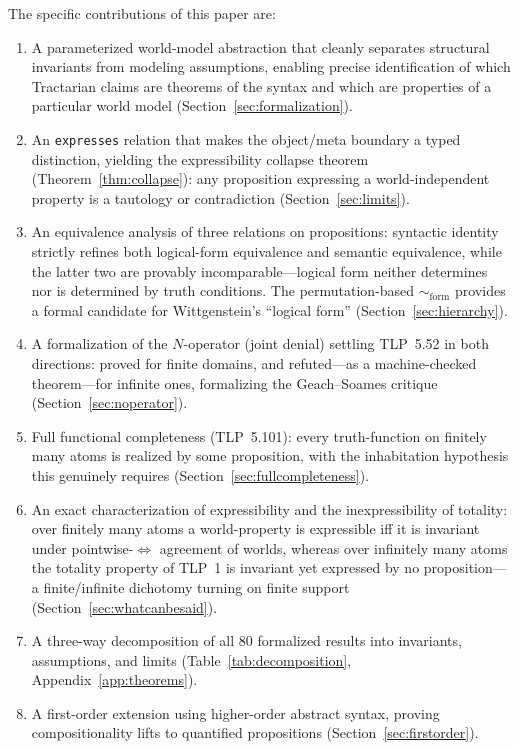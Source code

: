 \documentclass[jsl,bibother]{asl}
\theoremstyle{definition}
\theoremstyle{remark}
\newcommand{\formEq}{\sim_{\mathrm{form}}}
\begin{document}
\noindent
The specific contributions of this paper are:
\begin{enumerate}[nosep, label=(\arabic*)]
  \item A parameterized world-model abstraction that cleanly
    separates structural invariants from modeling assumptions,
    enabling precise identification of which Tractarian claims
    are theorems of the syntax and which are properties of a
    particular world model (Section~\ref{sec:formalization}).
  \item An \texttt{expresses} relation that makes the object/meta
    boundary a typed distinction, yielding the expressibility
    collapse theorem (Theorem~\ref{thm:collapse}): any proposition
    expressing a world-independent property is a tautology or
    contradiction (Section~\ref{sec:limits}).
  \item An equivalence analysis of three relations on
    propositions: syntactic identity strictly refines both
    logical-form equivalence and semantic equivalence, while the
    latter two are provably incomparable---logical form neither
    determines nor is determined by truth conditions.  The
    permutation-based $\formEq$ provides a formal candidate for
    Wittgenstein's ``logical form'' (Section~\ref{sec:hierarchy}).
  \item A formalization of the $N$-operator (joint denial)
    settling TLP~5.52 in both directions: proved for finite
    domains, and refuted---as a machine-checked theorem---for
    infinite ones, formalizing the Geach--Soames critique
    (Section~\ref{sec:noperator}).
  \item Full functional completeness (TLP~5.101): every
    truth-function on finitely many atoms is realized by some
    proposition, with the inhabitation hypothesis this genuinely
    requires (Section~\ref{sec:fullcompleteness}).
  \item An exact characterization of expressibility and the
    inexpressibility of totality: over finitely many atoms a
    world-property is expressible iff it is invariant under
    pointwise-$\iff$ agreement of worlds, whereas over infinitely
    many atoms the totality property of TLP~1 is invariant yet
    expressed by no proposition---a finite/infinite dichotomy
    turning on finite support (Section~\ref{sec:whatcanbesaid}).
  \item A three-way decomposition of all 80 formalized results
    into invariants, assumptions, and limits
    (Table~\ref{tab:decomposition}, Appendix~\ref{app:theorems}).
  \item A first-order extension using higher-order abstract syntax,
    proving compositionality lifts to quantified propositions
    (Section~\ref{sec:firstorder}).
\end{enumerate}
\end{document}
